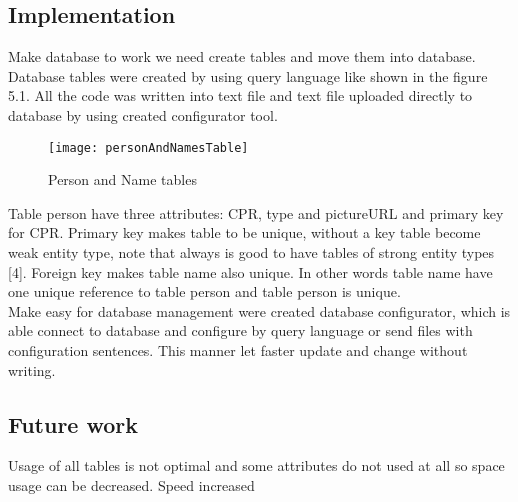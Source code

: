 \subsection{Implementation}

Make database to work we need create tables and move them into database. Database tables were created by using query language like shown in the figure 5.1. All the code was written into text file and text file uploaded directly to database by using created configurator tool.

\begin{figure}[h]
	\centering
		\texttt{[image: personAndNamesTable]}
	\caption{Person and Name tables}
	\label{fig:planning}
\end{figure}

Table person have three attributes: CPR, type and pictureURL and primary key for CPR. Primary key makes table to be unique, without a key table become weak entity type, note that always is good to have tables of strong entity types [4]. Foreign key makes table name also unique. In other words table name have one unique reference to table person and table person is unique. \\ Make easy for database management were created database configurator, which is able connect to database and configure by query language or send files with configuration sentences. This manner let faster update and change without writing. 

\subsection{Future work}

Usage of all tables is not optimal and some attributes do not used at all so space usage can be decreased.
Speed increased